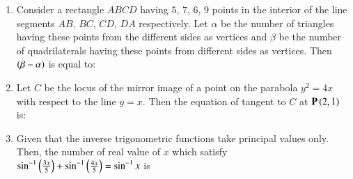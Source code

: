 \documentclass[journal,12pt,onecolumn]{IEEEtran}
\theoremstyle{remark}
\begin{document}
\begin{enumerate}
\item Consider a rectangle $ABCD$ having $5$, $7$, $6$, $9$ points in the interior of the line segments $AB$, $BC$, $CD$, $DA$ respectively. Let $\alpha$ be the number of triangles having these points from the different sides as vertices and $\beta$ be the number of quadrilaterals having these points from different sides as vertices. Then $\left(\beta-\alpha\right)$ is equal to: 

\hfill{}
\begin{enumerate}
\end{enumerate}

\item Let $C$ be the locus of the mirror image of a point on the parabola $y^2=4x$ with respect to the line $y=x$. Then the equation of tangent to $C$ at $\mathbf{P}\left(2,1\right)$ is:

\hfill{}
\begin{enumerate}
\end{enumerate}

\item Given that the inverse trigonometric functions take principal values only. Then, the number of real value of $x$ which satisfy $\sin^{-1}\left(\frac{3x}{5}\right)+\sin^{-1}\left(\frac{4x}{5}\right) = \sin^{-1}x$ is 

\hfill{}
\begin{enumerate}
\end{enumerate}

\end{enumerate}
\end{document}
